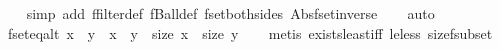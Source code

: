 \begin{isabellebody}
%
\isadelimproof
\ \ %
\endisadelimproof
%
\isatagproof
{}\isamarkupfalse%
\ {\isacharparenleft}simp\ add{\isacharcolon}\ ffilter{\isacharunderscore}def\ fBall{\isacharunderscore}def\ fset{\isacharunderscore}both{\isacharunderscore}sides\ Abs{\isacharunderscore}fset{\isacharunderscore}inverse{\isacharparenright}\isanewline
\ \ \isamarkupfalse%
\ auto%
\endisatagproof
{\isafoldproof}%
%
\isadelimproof
\isanewline
%
\endisadelimproof
\isanewline
{}\isamarkupfalse%
\ fset{\isacharunderscore}eq{\isacharunderscore}alt{\isacharcolon}\ {\isachardoublequoteopen}{\isacharparenleft}x\ {\isacharequal}\ y{\isacharparenright}\ {\isacharequal}\ {\isacharparenleft}x\ {\isacharbar}{\isasymsubseteq}{\isacharbar}\ y\ {\isasymand}\ size\ x\ {\isacharequal}\ size\ y{\isacharparenright}{\isachardoublequoteclose}\isanewline
%
\isadelimproof
\ \ %
\endisadelimproof
%
\isatagproof
{}\isamarkupfalse%
\ {\isacharparenleft}metis\ exists{\isacharunderscore}least{\isacharunderscore}iff\ le{\isacharunderscore}less\ size{\isacharunderscore}fsubset{\isacharparenright}%
\endisatagproof
{\isafoldproof}%
%
\isadelimproof
\isanewline
%
\endisadelimproof
%
\isadelimtheory
\isanewline
%
\endisadelimtheory
%
\isatagtheory
{}\isamarkupfalse%
%
\endisatagtheory
{\isafoldtheory}%
%
\isadelimtheory
%
\endisadelimtheory
%
\end{isabellebody}%
\endinput
